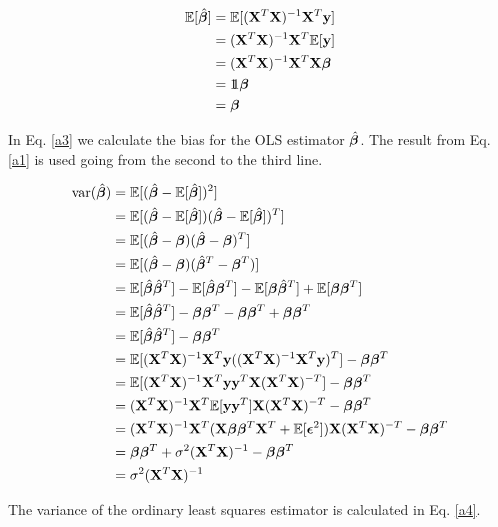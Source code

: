 \begin{align}\label{a3}
    \fv{\hat{\bet}} & = \fv{(\mathbf{X}^T\mathbf{X})^{-1}\mathbf{X}^T \y} \nonumber \\ 
    & = (\mathbf{X}^T\mathbf{X})^{-1}\mathbf{X}^T \fv{\y} \nonumber \\ 
    & = (\mathbf{X}^T\mathbf{X})^{-1}\mathbf{X}^T \mathbf{X}\bet \nonumber \\
    & = \unit \bet \nonumber \\
    & = \bet 
\end{align}

In Eq. \ref{a3} we calculate the bias for the OLS estimator $\hat{\bet}$. The result from Eq. \ref{a1} is used going from the second to the third line.

\begin{align}\label{a4}
    \text{var}(\hat{\bet}) & = \fv{(\hat{\bet}-\fv{\hat{\bet}})^2} \nonumber \\
    & = \fv{(\hat{\bet}-\fv{\hat{\bet}})(\hat{\bet}-\fv{\hat{\bet}})^T} \nonumber \\ 
    & = \fv{(\hat{\bet}-\bet)(\hat{\bet}-\bet)^T} \nonumber \\ 
    & = \fv{(\hat{\bet}-\bet)(\hat{\bet}^T-\bet^T)} \nonumber \\
    & = \fv{\hat{\bet}\hat{\bet}^T} - \fv{\hat{\bet}\bet^T} - \fv{\bet \hat{\bet}^T} + \fv{\bet \bet^T} \nonumber \\
    & = \fv{\hat{\bet}\hat{\bet}^T} - \bet\bet^T - \bet\bet^T + \bet\bet^T \nonumber \\
    & = \fv{\hat{\bet}\hat{\bet}^T} - \bet\bet^T \nonumber \\
    & = \fv{\betta(\betta)^T} - \bet\bet^T \nonumber \\
    & = \fv{\betta \y^T \mathbf{X}(\mathbf{X}^T\mathbf{X})^{-T}} - \bet\bet^T \nonumber \\
    & = (\mathbf{X}^T\mathbf{X})^{-1}\mathbf{X}^T\fv{\y\y^T}\mathbf{X}(\mathbf{X}^T\mathbf{X})^{-T} - \bet\bet^T \nonumber \\
    & = (\mathbf{X}^T\mathbf{X})^{-1}\mathbf{X}^T(\mathbf{X}\bet \bet^T \mathbf{X}^T + \fv{\boldsymbol{\epsilon}^2})\mathbf{X}(\mathbf{X}^T\mathbf{X})^{-T} - \bet\bet^T \nonumber \\
    & = \bet \bet^T + \sigma^2 (\mathbf{X}^T\mathbf{X})^{-1} - \bet \bet^T \nonumber \\
    & = \sigma^2 (\mathbf{X}^T\mathbf{X})^{-1}
\end{align}

The variance of the ordinary least squares estimator is calculated in Eq. \ref{a4}. 

